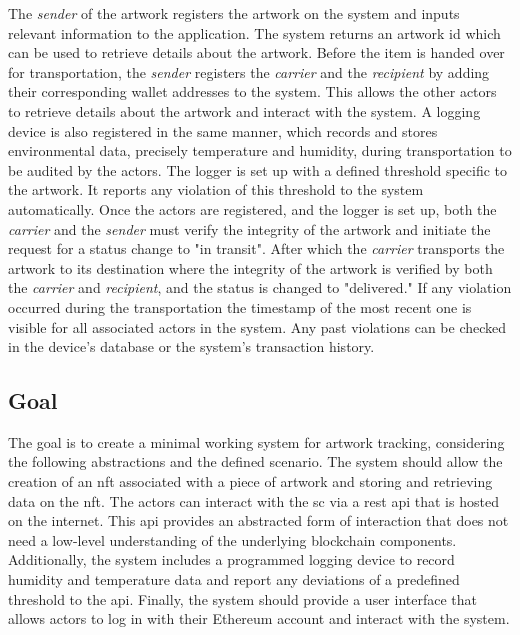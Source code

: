 The \textit{sender} of the artwork registers the artwork on the system and inputs relevant information to the application. The system returns an artwork \gls{id} which can be used to retrieve details about the artwork. Before the item is handed over for transportation, the \textit{sender} registers the \textit{carrier} and the \textit{recipient} by adding their corresponding wallet addresses to the system. This allows the other actors to retrieve details about the artwork and interact with the system. A logging device is also registered in the same manner, which records and stores environmental data, precisely temperature and humidity, during transportation to be audited by the actors. The logger is set up with a defined threshold specific to the artwork. It reports any violation of this threshold to the system automatically. Once the actors are registered, and the logger is set up, both the \textit{carrier} and the \textit{sender} must verify the integrity of the artwork and initiate the request for a status change to "in transit". After which the \textit{carrier} transports the artwork to its destination where the integrity of the artwork is verified by both the \textit{carrier} and \textit{recipient}, and the status is changed to "delivered." If any violation occurred during the transportation the timestamp of the most recent one is visible for all associated actors in the system. Any past violations can be checked in the device's database or the system's transaction history.

\subsection*{Goal}
The goal is to create a minimal working system for artwork tracking, considering the following abstractions and the defined scenario. The system should allow the creation of an \gls{nft} associated with a piece of artwork and storing and retrieving data on the \gls{nft}. The actors can interact with the \gls{sc} via a \gls{rest} \gls{api} that is hosted on the internet. This \gls{api} provides an abstracted form of interaction that does not need a low-level understanding of the underlying blockchain components. Additionally, the system includes a programmed logging device to record humidity and temperature data and report any deviations of a predefined threshold to the \gls{api}. Finally, the system should provide a user interface that allows actors to log in with their Ethereum account and interact with the system.

